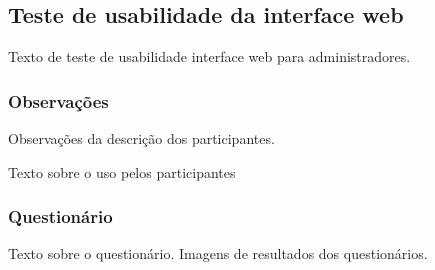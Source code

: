 \subsection{Teste de usabilidade da interface web}

Texto de teste de usabilidade interface web para administradores.

\subsubsection{Observações}

Observações da descrição dos participantes.

Texto sobre o uso pelos participantes

\subsubsection{Questionário}

Texto sobre o questionário.
Imagens de resultados dos questionários.
